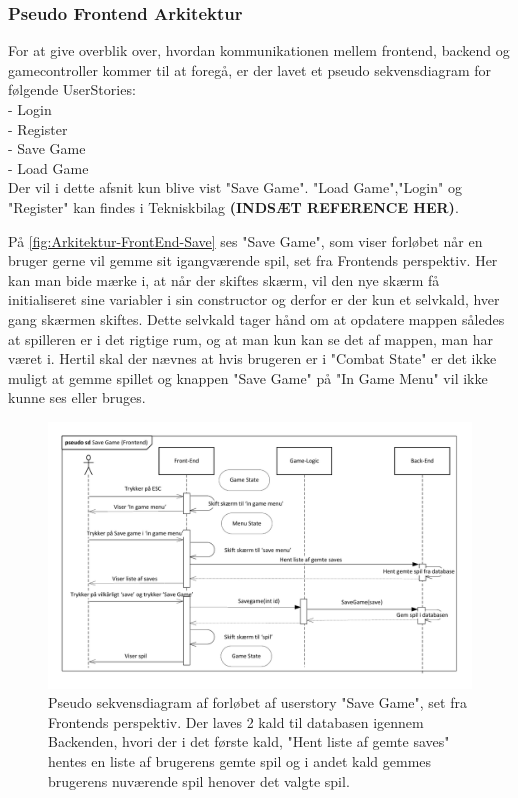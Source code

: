 \subsubsection{Pseudo Frontend Arkitektur}
For at give overblik over, hvordan kommunikationen mellem frontend, backend og gamecontroller kommer til at foregå, er der lavet et pseudo sekvensdiagram for følgende UserStories:
\\
- Login\\
- Register\\
- Save Game\\
- Load Game\\

Der vil i dette afsnit kun blive vist "Save Game". "Load Game","Login" og "Register" kan findes i Tekniskbilag \textbf{(INDSÆT REFERENCE HER)}.

\noindent På \autoref{fig:Arkitektur-FrontEnd-Save} ses "Save Game", som viser forløbet når en bruger gerne vil gemme sit igangværende spil, set fra Frontends perspektiv. Her kan man bide mærke i, at når der skiftes skærm, vil den nye skærm få initialiseret sine variabler i sin constructor og derfor er der kun et selvkald, hver gang skærmen skiftes. Dette selvkald tager hånd om at opdatere mappen således at spilleren er i det rigtige rum, og at man kun kan se det af mappen, man har været i.
Hertil skal der nævnes at hvis brugeren er i "Combat State" er det ikke muligt at gemme spillet og knappen "Save Game" på "In Game Menu" vil ikke kunne ses eller bruges.\\

\begin{figure}[H]
\centering
\includegraphics[width = \textwidth]{02-Body/Images/Front-End_-_Arkitektur-savegame.pdf}
\caption{Pseudo sekvensdiagram af forløbet af userstory "Save Game", set fra Frontends perspektiv. Der laves 2 kald til databasen igennem Backenden, hvori der i det første kald,  "Hent liste af gemte saves" hentes en liste af brugerens gemte spil og i andet kald gemmes brugerens nuværende spil henover det valgte spil.}
\label{fig:Arkitektur-FrontEnd-Save}
\end{figure}

\newpage
